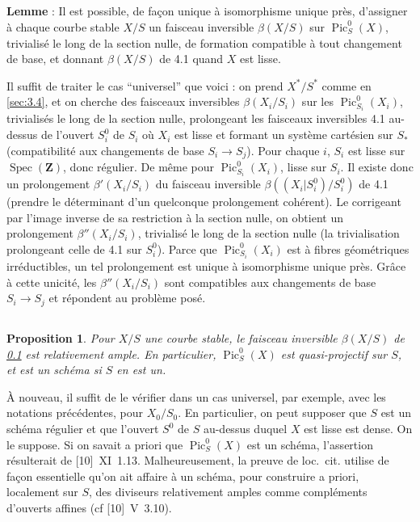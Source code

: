 \documentclass[12pt,a4paper]{article}
\theoremstyle{plain}
\newtheorem{proposition}[theorem]{Proposition}
\theoremstyle{definition}
\theoremstyle{remark}
\DeclareMathOperator{\Pic}{Pic}
\DeclareMathOperator{\Spec}{Spec}
\begin{document}
\subsection{}\label{sec:4.2}

\textbf{Lemme} : Il est possible, de façon unique à isomorphisme unique près, d'assigner à chaque courbe stable $X/S$ un faisceau inversible $\beta(X/S)$ sur $\Pic_S^0(X)$, trivialisé le long de la section nulle, de formation compatible à tout changement de base, et donnant $\beta(X/S)$ de 4.1 quand $X$ est lisse.

Il suffit de traiter le cas ``universel'' que voici : on prend $X^*/S^*$ comme en \ref{sec:3.4}, et on cherche des faisceaux inversibles $\beta(X_i/S_i)$ sur les $\Pic_{S_i}^0(X_i)$, trivialisés le long de la section nulle, prolongeant les faisceaux inversibles 4.1 au-dessus de l'ouvert $S_i^0$ de $S_i$ où $X_i$ est lisse et formant un système cartésien sur $S_*$ (compatibilité aux changements de base $S_i \to S_j$). Pour chaque $i$, $S_i$ est lisse sur $\Spec(\mathbf{Z})$, donc régulier. De même pour $\Pic_{S_i}^0(X_i)$, lisse sur $S_i$. Il existe donc un prolongement $\beta'(X_i/S_i)$ du faisceau inversible $\beta((X_i|S_i^0)/S_i^0)$ de 4.1 (prendre le déterminant d'un quelconque prolongement cohérent). Le corrigeant par l'image inverse de sa restriction à la section nulle, on obtient un prolongement $\beta''(X_i/S_i)$, trivialisé le long de la section nulle (la trivialisation prolongeant celle de 4.1 sur $S_i^0$). Parce que $\Pic_{S_i}^0(X_i)$ est à fibres géométriques irréductibles, un tel prolongement est unique à isomorphisme unique près. Grâce à cette unicité, les $\beta''(X_i/S_i)$ sont compatibles aux changements de base $S_i \to S_j$ et répondent au problème posé.

\subsection{}\label{sec:4.3}

\begin{proposition}
Pour $X/S$ une courbe stable, le faisceau inversible $\beta(X/S)$ de \ref{sec:4.2} est relativement ample. En particulier, $\Pic_S^0(X)$ est quasi-projectif sur $S$, et est un schéma si $S$ en est un.
\end{proposition}

À nouveau, il suffit de le vérifier dans un cas universel, par exemple, avec les notations précédentes, pour $X_0/S_0$. En particulier, on peut supposer que $S$ est un schéma régulier et que l'ouvert $S^0$ de $S$ au-dessus duquel $X$ est lisse est dense. On le suppose. Si on savait a priori que $\Pic_S^0(X)$ est un schéma, l'assertion résulterait de [10]~XI~1.13. Malheureusement, la preuve de loc.~cit. utilise de façon essentielle qu'on ait affaire à un schéma, pour construire a priori, localement sur $S$, des diviseurs relativement amples comme compléments d'ouverts affines (cf [10]~V~3.10).
\end{document}
